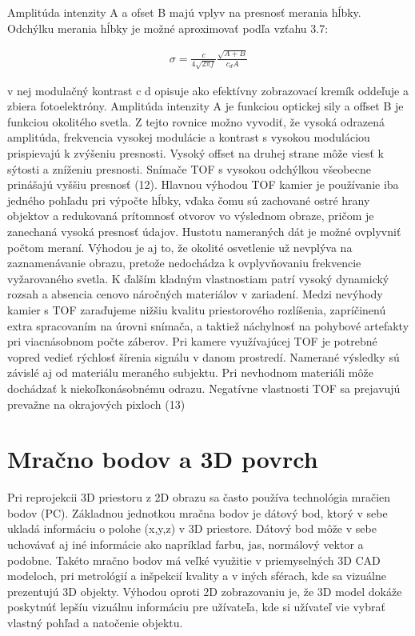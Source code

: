 Amplitúda intenzity A a ofset B majú vplyv na presnosť merania hĺbky. Odchýlku merania hĺbky je možné aproximovať podľa vzťahu 3.7:

\begin{equation}
\label{eq7}
\begin{aligned}
\sigma=\frac{c}{4\sqrt{2 \pi f}} \frac{\sqrt{A+B}}{c_d A}
\end{aligned}
\end{equation}

v nej modulačný kontrast c d opisuje ako efektívny zobrazovací kremík oddeľuje a zbiera fotoelektróny. Amplitúda intenzity A je funkciou optickej sily a offset B je funkciou okolitého svetla. Z tejto rovnice možno vyvodiť, že vysoká odrazená amplitúda, frekvencia vysokej modulácie a kontrast s vysokou moduláciou prispievajú k zvýšeniu presnosti. Vysoký offset na druhej strane môže viesť k sýtosti a zníženiu presnosti. Snímače TOF s vysokou odchýlkou všeobecne prinášajú vyššiu presnosť (12). Hlavnou výhodou TOF kamier je používanie iba jedného pohľadu pri výpočte hĺbky, vďaka čomu sú zachované ostré hrany objektov a redukovaná prítomnosť otvorov vo výslednom obraze, pričom je zanechaná vysoká presnosť údajov. Hustotu nameraných dát je možné ovplyvniť počtom meraní. Výhodou je aj to, že okolité osvetlenie už nevplýva na zaznamenávanie obrazu, pretože nedochádza k ovplyvňovaniu frekvencie vyžarovaného svetla. K ďalším kladným vlastnostiam patrí vysoký dynamický rozsah a absencia cenovo náročných materiálov v zariadení. Medzi nevýhody kamier s TOF zaraďujeme nižšiu kvalitu priestorového rozlíšenia, zapríčinenú extra spracovaním na úrovni snímača, a taktiež náchylnosť na pohybové artefakty pri viacnásobnom počte záberov. Pri kamere využívajúcej TOF je potrebné vopred vedieť rýchlosť šírenia signálu v danom prostredí. Namerané výsledky sú závislé aj od materiálu meraného subjektu. Pri nevhodnom materiáli môže dochádzať k niekoľkonásobnému odrazu. Negatívne vlastnosti TOF sa prejavujú prevažne na okrajových pixloch (13)

\section{Mračno bodov a 3D povrch}

Pri reprojekcii 3D priestoru z 2D obrazu sa často používa technológia mračien bodov (PC). Základnou jednotkou mračna bodov je dátový bod, ktorý v sebe ukladá informáciu o polohe (x,y,z) v 3D priestore. Dátový bod môže v sebe uchovávať aj iné informácie ako napríklad farbu, jas, normálový vektor a podobne. Takéto mračno bodov má veľké využitie v priemyselných 3D CAD modeloch, pri metrológií a inšpekcií kvality a v iných sférach, kde sa vizuálne prezentujú 3D objekty. Výhodou oproti 2D zobrazovaniu je, že 3D model dokáže poskytnúť lepšíu vizuálnu informáciu pre užívateľa, kde si užívateľ vie vybrať vlastný pohľad a natočenie objektu.


